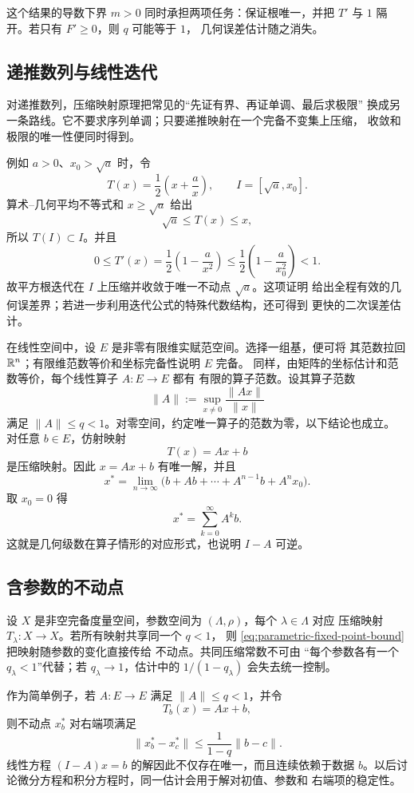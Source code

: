 这个结果的导数下界 \(m>0\) 同时承担两项任务：保证根唯一，并把
\(T'\) 与 \(1\) 隔开。若只有 \(F'\ge0\)，则 \(q\) 可能等于 \(1\)，
几何误差估计随之消失。

\subsection{递推数列与线性迭代}

对递推数列，压缩映射原理把常见的“先证有界、再证单调、最后求极限”
换成另一条路线。它不要求序列单调；只要递推映射在一个完备不变集上压缩，
收敛和极限的唯一性便同时得到。

例如 \(a>0\)、\(x_0>\sqrt a\) 时，令
\[
 T(x)=\frac12\left(x+\frac{a}{x}\right),\qquad
 I=[\sqrt a,x_0].
\]
算术--几何平均不等式和 \(x\ge\sqrt a\) 给出
\[
 \sqrt a\le T(x)\le x,
\]
所以 \(T(I)\subset I\)。并且
\[
 0\le T'(x)=\frac12\left(1-\frac{a}{x^2}\right)
 \le\frac12\left(1-\frac{a}{x_0^2}\right)<1.
\]
故平方根迭代在 \(I\) 上压缩并收敛于唯一不动点 \(\sqrt a\)。这项证明
给出全程有效的几何误差界；若进一步利用迭代公式的特殊代数结构，还可得到
更快的二次误差估计。

在线性空间中，设 \(E\) 是非零有限维实赋范空间。选择一组基，便可将
其范数拉回 \(\mathbb{R}^n\)；有限维范数等价和坐标完备性说明 \(E\) 完备。
同样，由矩阵的坐标估计和范数等价，每个线性算子 \(A:E\to E\) 都有
有限的算子范数。设其算子范数
\[
 \|A\|:=\sup_{x\ne0}\frac{\|Ax\|}{\|x\|}
\]
满足 \(\|A\|\le q<1\)。对零空间，约定唯一算子的范数为零，以下结论也成立。
对任意 \(b\in E\)，仿射映射
\[
 T(x)=Ax+b
\]
是压缩映射。因此 \(x=Ax+b\) 有唯一解，并且
\[
 x^\ast=\lim_{n\to\infty}
 \bigl(b+Ab+\cdots+A^{n-1}b+A^nx_0\bigr).
\]
取 \(x_0=0\) 得
\[
 x^\ast=\sum_{k=0}^{\infty}A^k b.
\]
这就是几何级数在算子情形的对应形式，也说明 \(I-A\) 可逆。

\subsection{含参数的不动点}

设 \(X\) 是非空完备度量空间，参数空间为 \((\Lambda,\rho)\)，每个 \(\lambda\in\Lambda\) 对应
压缩映射 \(T_\lambda:X\to X\)。若所有映射共享同一个 \(q<1\)，
则 \eqref{eq:parametric-fixed-point-bound} 把映射随参数的变化直接传给
不动点。共同压缩常数不可由
“每个参数各有一个 \(q_\lambda<1\)”代替；若
\(q_\lambda\to1\)，估计中的 \(1/(1-q_\lambda)\) 会失去统一控制。

作为简单例子，若 \(A:E\to E\) 满足 \(\|A\|\le q<1\)，并令
\[
 T_b(x)=Ax+b,
\]
则不动点 \(x_b^\ast\) 对右端项满足
\[
 \|x_b^\ast-x_c^\ast\|
 \le\frac{1}{1-q}\|b-c\|.
\]
线性方程 \((I-A)x=b\) 的解因此不仅存在唯一，而且连续依赖于数据
\(b\)。以后讨论微分方程和积分方程时，同一估计会用于解对初值、参数和
右端项的稳定性。


